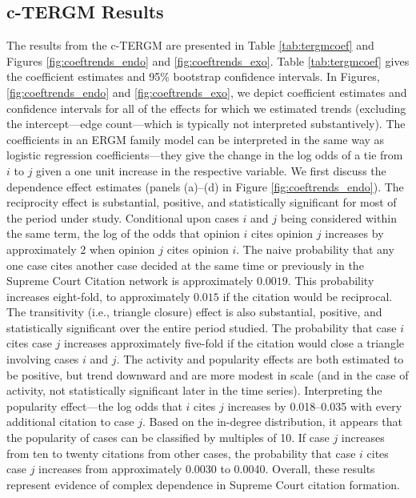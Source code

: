 \documentclass[headsepline=true, abstracton]{scrartcl}
\begin{document}
\subsection{c-TERGM Results}
The results from the c-TERGM are presented in Table \ref{tab:tergmcoef} and Figures \ref{fig:coeftrends_endo} and \ref{fig:coeftrends_exo}. Table \ref{tab:tergmcoef} gives the coefficient estimates and 95\% bootstrap confidence intervals. In Figures, \ref{fig:coeftrends_endo} and \ref{fig:coeftrends_exo}, we depict coefficient estimates and confidence intervals for all of the effects for which we estimated trends (excluding the intercept---edge count---which is typically not interpreted substantively). The coefficients in an ERGM family model can be interpreted in the same way as logistic regression coefficients---they give the change in the log odds of a tie from $i$ to $j$ given a one unit increase in the respective variable. We first discuss the dependence effect estimates (panels (a)--(d) in Figure \ref{fig:coeftrends_endo}). The reciprocity effect is substantial, positive, and statistically significant for most of the period under study. Conditional upon cases $i$ and $j$ being considered within the same term, the log of the odds that opinion $i$ cites opinion $j$ increases by approximately $2$ when opinion $j$ cites opinion $i$. The naive probability that any one case cites another case decided at the same time or previously in the Supreme Court Citation network is approximately $0.0019$. This probability increases eight-fold, to approximately $0.015$ if the citation would be reciprocal. The transitivity (i.e., triangle closure) effect is also substantial, positive, and statistically significant over the entire period studied. The probability that case $i$ cites case $j$ increases approximately five-fold if the citation would close a triangle involving cases $i$ and $j$. The activity and popularity effects are both estimated to be positive, but trend downward and are more modest in scale (and in the case of activity, not statistically significant later in the time series). Interpreting the popularity effect---the log odds that $i$ cites $j$ increases by 0.018--0.035 with every additional citation to case $j$. Based on the in-degree distribution, it appears that the popularity of cases can be classified by multiples of 10. If case $j$ increases from ten to twenty citations from other cases, the probability that case $i$ cites case $j$ increases from approximately 0.0030 to 0.0040. Overall, these results represent evidence of complex dependence in Supreme Court citation formation.
\end{document}
